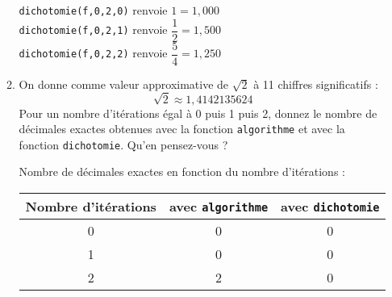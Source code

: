 \documentclass[a4paper,12pt]{article}
\begin{document}
\begin{enumerate}
\begin{enumerate}
\begin{solution}
\verb?dichotomie(f,0,2,0)? renvoie $1=1,000$\\
\verb?dichotomie(f,0,2,1)? renvoie $\dfrac{1}{2}=1,500$\\
\verb?dichotomie(f,0,2,2)? renvoie $\dfrac{5}{4}=1,250$\\
\end{solution}
\item On donne comme valeur approximative de $\sqrt{2}$ à 11 chiffres significatifs :
\[\sqrt{2}\approx 1,4142135624\]
Pour un nombre d'itérations égal à 0 puis 1 puis 2, donnez le nombre de décimales exactes obtenues avec la fonction \verb?algorithme? et avec la fonction \verb?dichotomie?. Qu'en pensez-vous ?
\begin{solution}
Nombre de décimales exactes en fonction du nombre d'itérations : \\
\begin{tabular}{c|c|c}
Nombre d'itérations & avec \verb?algorithme? & avec \verb?dichotomie?  \\ \hline
0 & 0 &0\\
1&0&0\\2&2&0
\end{tabular}\\
\end{solution}
\end{enumerate}
\end{enumerate}
\end{document}
